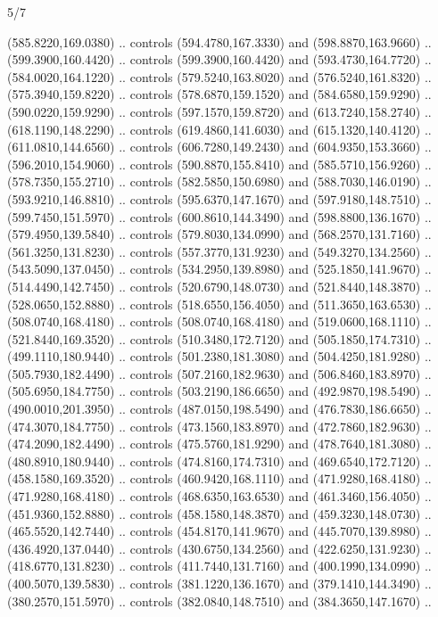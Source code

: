 \begin{flagdescription}{5/7}
\begin{scope}[xshift=0.5\flaglength]
\begin{scope}[scale=0.0019\flagwidth,yshift=190.5mm,xshift=-137.7mm]
\begin{scope}[y=0.80pt, x=0.80pt, yscale=-1, xscale=1, inner sep=0pt, outer sep=0pt]
  (585.8220,169.0380) .. controls (594.4780,167.3330) and (598.8870,163.9660) ..
  (599.3900,160.4420) .. controls (599.3900,160.4420) and (593.4730,164.7720) ..
  (584.0020,164.1220) .. controls (579.5240,163.8020) and (576.5240,161.8320) ..
  (575.3940,159.8220) .. controls (578.6870,159.1520) and (584.6580,159.9290) ..
  (590.0220,159.9290) .. controls (597.1570,159.8720) and (613.7240,158.2740) ..
  (618.1190,148.2290) .. controls (619.4860,141.6030) and (615.1320,140.4120) ..
  (611.0810,144.6560) .. controls (606.7280,149.2430) and (604.9350,153.3660) ..
  (596.2010,154.9060) .. controls (590.8870,155.8410) and (585.5710,156.9260) ..
  (578.7350,155.2710) .. controls (582.5850,150.6980) and (588.7030,146.0190) ..
  (593.9210,146.8810) .. controls (595.6370,147.1670) and (597.9180,148.7510) ..
  (599.7450,151.5970) .. controls (600.8610,144.3490) and (598.8800,136.1670) ..
  (579.4950,139.5840) .. controls (579.8030,134.0990) and (568.2570,131.7160) ..
  (561.3250,131.8230) .. controls (557.3770,131.9230) and (549.3270,134.2560) ..
  (543.5090,137.0450) .. controls (534.2950,139.8980) and (525.1850,141.9670) ..
  (514.4490,142.7450) .. controls (520.6790,148.0730) and (521.8440,148.3870) ..
  (528.0650,152.8880) .. controls (518.6550,156.4050) and (511.3650,163.6530) ..
  (508.0740,168.4180) .. controls (508.0740,168.4180) and (519.0600,168.1110) ..
  (521.8440,169.3520) .. controls (510.3480,172.7120) and (505.1850,174.7310) ..
  (499.1110,180.9440) .. controls (501.2380,181.3080) and (504.4250,181.9280) ..
  (505.7930,182.4490) .. controls (507.2160,182.9630) and (506.8460,183.8970) ..
  (505.6950,184.7750) .. controls (503.2190,186.6650) and (492.9870,198.5490) ..
  (490.0010,201.3950) .. controls (487.0150,198.5490) and (476.7830,186.6650) ..
  (474.3070,184.7750) .. controls (473.1560,183.8970) and (472.7860,182.9630) ..
  (474.2090,182.4490) .. controls (475.5760,181.9290) and (478.7640,181.3080) ..
  (480.8910,180.9440) .. controls (474.8160,174.7310) and (469.6540,172.7120) ..
  (458.1580,169.3520) .. controls (460.9420,168.1110) and (471.9280,168.4180) ..
  (471.9280,168.4180) .. controls (468.6350,163.6530) and (461.3460,156.4050) ..
  (451.9360,152.8880) .. controls (458.1580,148.3870) and (459.3230,148.0730) ..
  (465.5520,142.7440) .. controls (454.8170,141.9670) and (445.7070,139.8980) ..
  (436.4920,137.0440) .. controls (430.6750,134.2560) and (422.6250,131.9230) ..
  (418.6770,131.8230) .. controls (411.7440,131.7160) and (400.1990,134.0990) ..
  (400.5070,139.5830) .. controls (381.1220,136.1670) and (379.1410,144.3490) ..
  (380.2570,151.5970) .. controls (382.0840,148.7510) and (384.3650,147.1670) ..

\end{scope}
\end{scope}
\end{scope}
\end{flagdescription}
